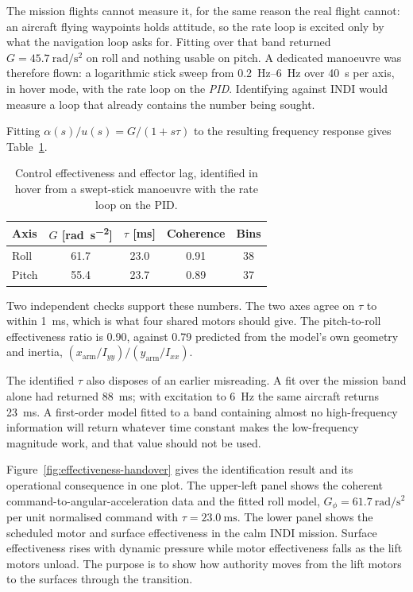 \documentclass{article}
\begin{document}
The mission flights cannot measure it, for the same reason the real flight cannot: an aircraft flying waypoints holds attitude, so the rate loop is excited only by what the navigation loop asks for. Fitting over that band returned $G = \SI{45.7}{\radian\per\second\squared}$ on roll and nothing usable on pitch. A dedicated manoeuvre was therefore flown: a logarithmic stick sweep from \SIrange{0.2}{6}{\hertz} over \SI{40}{\second} per axis, in hover mode, with the rate loop on the \emph{PID}. Identifying against INDI would measure a loop that already contains the number being sought.

Fitting $\alpha(s)/u(s) = G/(1+s\tau)$ to the resulting frequency response gives Table~\ref{tab:identification}.

\begin{table}[H]
\centering
\caption{Control effectiveness and effector lag, identified in hover from a swept-stick manoeuvre with the rate loop on the PID.}
\label{tab:identification}
\begin{tabular}{lcccc}
\hline
Axis & $G$ [\si{\radian\per\second\squared}] & $\tau$ [\si{\milli\second}] & Coherence & Bins \\
\hline
Roll  & 61.7 & 23.0 & 0.91 & 38 \\
Pitch & 55.4 & 23.7 & 0.89 & 37 \\
\hline
\end{tabular}
\end{table}

Two independent checks support these numbers. The two axes agree on $\tau$ to within \SI{1}{\milli\second}, which is what four shared motors should give. The pitch-to-roll effectiveness ratio is 0.90, against 0.79 predicted from the model's own geometry and inertia, $\left(x_\mathrm{arm}/I_{yy}\right)/\left(y_\mathrm{arm}/I_{xx}\right)$.

The identified $\tau$ also disposes of an earlier misreading. A fit over the mission band alone had returned \SI{88}{\milli\second}; with excitation to \SI{6}{\hertz} the same aircraft returns \SI{23}{\milli\second}. A first-order model fitted to a band containing almost no high-frequency information will return whatever time constant makes the low-frequency magnitude work, and that value should not be used.

Figure~\ref{fig:effectiveness-handover} gives the identification result and its operational consequence in one plot. The upper-left panel shows the coherent command-to-angular-acceleration data and the fitted roll model, $G_\phi=\SI{61.7}{\radian\per\second\squared}$ per unit normalised command with $\tau=\SI{23.0}{\milli\second}$. The lower panel shows the scheduled motor and surface effectiveness in the calm INDI mission. Surface effectiveness rises with dynamic pressure while motor effectiveness falls as the lift motors unload. The purpose is to show how authority moves from the lift motors to the surfaces through the transition.
\end{document}
